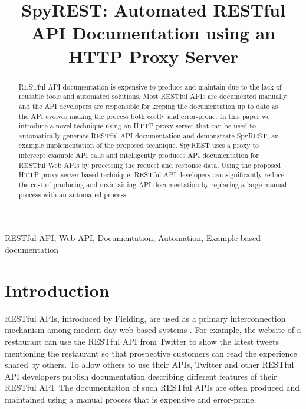 \documentclass[conference]{IEEEtran}
\begin{document}
\title{SpyREST: Automated RESTful API Documentation using an HTTP Proxy Server}


\author{
}
\maketitle


\begin{abstract}
RESTful API documentation is expensive to produce and maintain due to the lack of reusable tools and automated solutions. Most RESTful APIs are documented manually and the API developers are responsible for keeping the documentation up to date as the API evolves making the process both costly and error-prone. In this paper we introduce a novel technique using an HTTP proxy server that can be used to automatically generate RESTful API documentation and demonstrate SpyREST, an example implementation of the proposed technique. SpyREST uses a proxy to intercept example API calls and intelligently produces API documentation for RESTful Web APIs by processing the request and response data. Using the proposed HTTP proxy server based technique, RESTful API developers can significantly reduce the cost of producing and maintaining API documentation by replacing a large manual process with an automated process.
\end{abstract}

\IEEEpeerreviewmaketitle

\begin{IEEEkeywords}
RESTful API, Web API, Documentation, Automation, Example based documentation
\end{IEEEkeywords}


\section{Introduction}
RESTful APIs, introduced by Fielding, are used as a primary interconnection mechanism among modern day web based systems \cite{Fielding_rest}. For example, the website of a restaurant can use the RESTful API from Twitter to show the latest tweets mentioning the restaurant so that prospective customers can read the experience shared by others. To allow others to use their APIs, Twitter and other RESTful API developers publish documentation describing different features of their RESTful API. The documentation of such RESTful APIs are often produced and maintained using a manual process that is expensive and error-prone.
\end{document}
